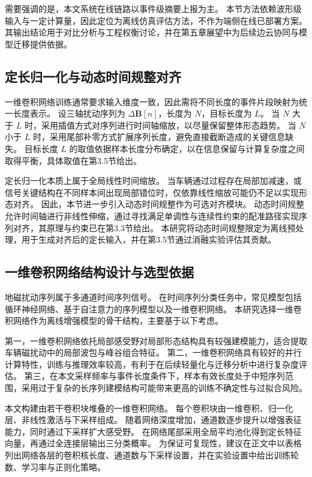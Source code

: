 \documentclass{xdupgthesis}
\begin{document}
需要强调的是，本文系统在线链路以事件级摘要上报为主。
本节方法依赖波形级输入与一定计算量，因此定位为离线仿真评估方法，不作为端侧在线已部署方案。
其输出结论用于对比分析与工程权衡讨论，并在第五章展望中为后续边云协同与模型迁移提供依据。

\subsection{定长归一化与动态时间规整对齐}
一维卷积网络训练通常要求输入维度一致，因此需将不同长度的事件片段映射为统一长度表示。
设三轴扰动序列为 $\Delta\mathbf{B}[n]$，长度为 $N$，目标长度为 $L$。
当 $N$ 大于 $L$ 时，采用插值方式对序列进行时间轴缩放，以尽量保留整体形态趋势。
当 $N$ 小于 $L$ 时，采用尾部补零方式扩展序列长度，避免直接截断造成的关键信息缺失。
目标长度 $L$ 的取值依据样本长度分布确定，以在信息保留与计算复杂度之间取得平衡，具体取值在第3.5节给出。

定长归一化本质上属于全局线性时间缩放。
当车辆通过过程存在局部加减速，或信号关键结构在不同样本间出现局部错位时，仅依靠线性缩放可能仍不足以实现形态对齐。
因此，本节进一步引入动态时间规整作为可选对齐模块。
动态时间规整允许时间轴进行非线性伸缩，通过寻找满足单调性与连续性约束的配准路径实现序列对齐，其原理与约束已在第3.3节给出。
本研究将动态时间规整限定为离线预处理，用于生成对齐后的定长输入，并在第3.5节通过消融实验评估其贡献。

\subsection{一维卷积网络结构设计与选型依据}
地磁扰动序列属于多通道时间序列信号。
在时间序列分类任务中，常见模型包括循环神经网络、基于自注意力的序列模型以及一维卷积网络。
本研究选择一维卷积网络作为离线增强模型的骨干结构，主要基于以下考虑。

第一，一维卷积网络依托局部感受野对局部形态结构具有较强建模能力，适合提取车辆磁扰动中的局部波包与峰谷组合特征。
第二，一维卷积网络具有较好的并行计算特性，训练与推理效率较高，有利于在后续轻量化与迁移分析中进行复杂度评估。
第三，在本文采样频率与事件长度条件下，样本有效长度处于中短序列范围，采用过于复杂的长序列建模结构可能带来更高的训练不确定性与过拟合风险。

本文构建由若干卷积块堆叠的一维卷积网络。
每个卷积块由一维卷积、归一化层、非线性激活与下采样组成。
随着网络深度增加，通道数逐步提升以增强表征能力，同时通过下采样扩大感受野。
在网络尾部采用全局平均池化得到定长特征向量，再通过全连接层输出三分类概率。
为保证可复现性，建议在正文中以表格列出网络各层的卷积核长度、通道数与下采样设置，并在实验设置中给出训练轮数、学习率与正则化策略。
\end{document}
